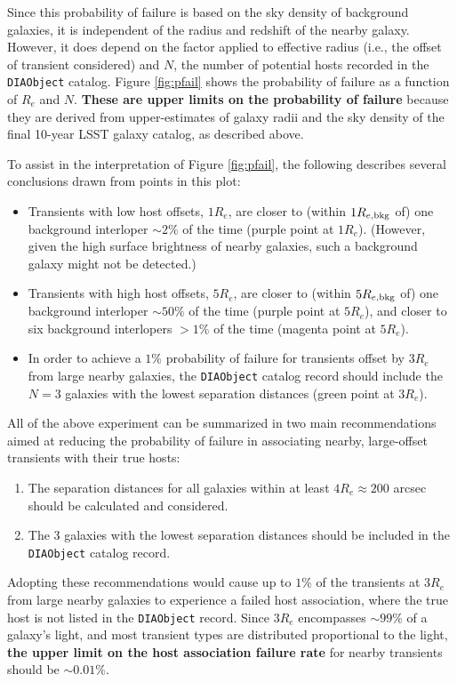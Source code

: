 \documentclass[DM,authoryear,toc]{lsstdoc}
\begin{document}
Since this probability of failure is based on the sky density of background galaxies, it is independent of the radius and redshift of the nearby galaxy. 
However, it does depend on the factor applied to effective radius (i.e., the offset of transient considered) and $N$, the number of potential hosts recorded in the {\tt DIAObject} catalog.
Figure \ref{fig:pfail} shows the probability of failure as a function of $R_e$ and $N$.
\textbf{These are upper limits on the probability of failure} because they are derived from upper-estimates of galaxy radii and the sky density of the final 10-year LSST galaxy catalog, as described above. 

To assist in the interpretation of Figure \ref{fig:pfail}, the following describes several conclusions drawn from points in this plot:
\begin{itemize}
\item Transients with low host offsets, $1R_e$, are closer to (within $1R_{e,{\rm bkg}}$ of) one background interloper $\sim2\%$ of the time (purple point at $1R_e$). (However, given the high surface brightness of nearby galaxies, such a background galaxy might not be detected.)
\item Transients with high host offsets, $5R_e$, are closer to (within $5R_{e,{\rm bkg}}$ of) one background interloper $\sim50\%$ of the time (purple point at $5R_e$), and closer to six background interlopers $>1\%$ of the time (magenta point at $5R_e$).
\item In order to achieve a $1\%$ probability of failure for transients offset by $3R_e$ from large nearby galaxies, the {\tt DIAObject} catalog record should include the $N=3$ galaxies with the lowest separation distances (green point at $3R_e$).
\end{itemize} 

All of the above experiment can be summarized in two main recommendations aimed at reducing the probability of failure in associating nearby, large-offset transients with their true hosts:
\begin{enumerate}
\item The separation distances for all galaxies within at least $4R_e \approx 200$ arcsec should be calculated and considered.
\item The 3 galaxies with the lowest separation distances should be included in the {\tt DIAObject} catalog record.
\end{enumerate}
Adopting these recommendations would cause up to $1\%$ of the transients at $3R_e$ from large nearby galaxies to experience a failed host association, where the true host is not listed in the {\tt DIAObject} record.
Since $3R_e$ encompasses $\sim99\%$ of a galaxy's light, and most transient types are distributed proportional to the light, \textbf{the upper limit on the host association failure rate} for nearby transients should be $\sim0.01\%$.
\end{document}
